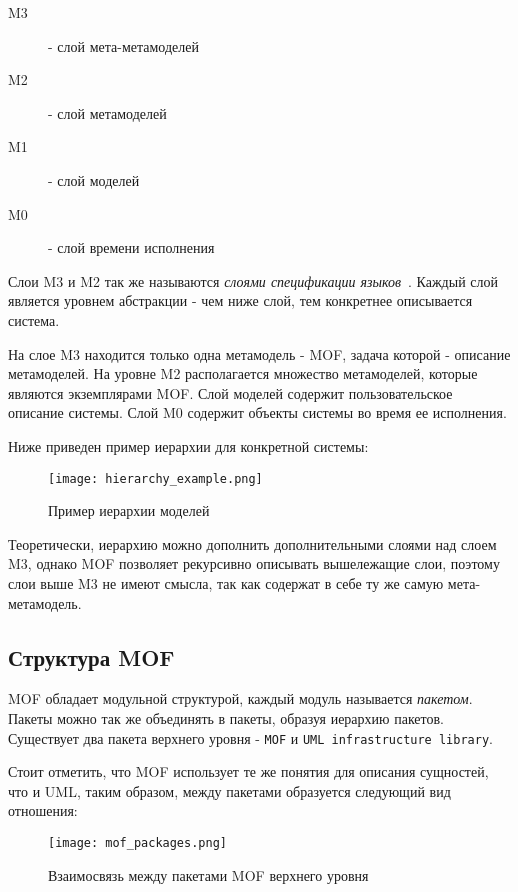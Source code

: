 \begin{description}
    \item[M3] - слой мета-метамоделей
    \item[M2] - слой метамоделей
    \item[M1] - слой моделей
    \item[M0] - слой времени исполнения
\end{description}

Слои M3 и M2 так же называются \emph{слоями спецификации
языков}~\cite{essay57286}. Каждый слой является уровнем абстракции - чем ниже
слой, тем конкретнее описывается система.

На слое M3 находится только одна метамодель - MOF,
задача которой - описание метамоделей. На уровне M2 располагается множество
метамоделей, которые являются экземплярами MOF. Слой моделей
содержит пользовательское описание системы. Слой M0 содержит объекты системы во
время ее исполнения.

Ниже приведен пример иерархии для конкретной системы:

\begin{figure}[ht]
    \begin{center}
        \texttt{[image: hierarchy\_example.png]}
    \end{center}
    \caption{Пример иерархии моделей}
    \label{fig:model_hierarchy}
\end{figure}

Теоретически, иерархию можно дополнить дополнительными слоями над слоем M3,
однако MOF позволяет рекурсивно описывать вышележащие слои, поэтому слои выше M3
не имеют смысла, так как содержат в себе ту же самую мета-метамодель.

\subsection{Структура MOF}

MOF обладает модульной структурой, каждый модуль называется \emph{пакетом}.
Пакеты можно так же объединять в пакеты, образуя иерархию пакетов. Существует
два пакета верхнего уровня - \texttt{MOF} и \texttt{UML infrastructure library}.

Стоит отметить, что MOF использует те же понятия для описания сущностей, что и
UML, таким образом, между пакетами образуется следующий вид отношения:

\begin{figure}[ht]
    \begin{center}
        \texttt{[image: mof\_packages.png]}
    \end{center}
    \caption{Взаимосвязь между пакетами MOF верхнего уровня}
    \label{fig:mof_packages}
\end{figure}

